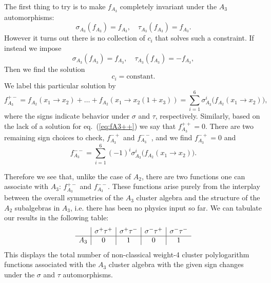 \documentclass[11pt]{article}
\begin{document}
The first thing to try is to make $f_{A_3}$ completely invariant under the $A_3$ automorphisms:
\begin{equation}\label{eq:fA3++}
	\sigma_{A_3}(f_{A_3}) = f_{A_3},\quad \tau_{A_3}(f_{A_3}) = f_{A_3}.  
\end{equation}
However it turns out there is no collection of $c_i$ that solves such a constraint. If instead we impose 
\begin{equation}
	\sigma_{A_3}(f_{A_3}) = f_{A_3},\quad \tau_{A_3}(f_{A_3}) = -f_{A_3},
\end{equation}
Then we find the solution 
\begin{equation}
	c_i = \text{constant}.
\end{equation}
We label this particular solution by 
\begin{equation}
	f_{A_3}^{+-} = f_{A_2}(x_1 \to x_2) + \ldots + f_{A_2}(x_1\to x_2 \left(1+x_3\right)) = \sum_{i=1}^6 \sigma_{A_3}^i\big(f_{A_2}(x_1\to x_2)\big),
\end{equation}
where the signs indicate behavior under $\sigma$ and $\tau$, respectively. Similarly, based on the lack of a solution for eq.~(\ref{eq:fA3++}) we say that $f_{A_3}^{++} = 0$. There are two remaining sign choices to check, $f_{A_3}^{-+}$ and $f_{A_3}^{--}$, and we find $f_{A_3}^{-+} = 0$ and		
\begin{equation}
	f_{A_3}^{--} =\sum_{i=1}^6(-1)^i\sigma_{A_3}^i \big(f_{A_2}(x_1\to x_2)\big).
\end{equation}

Therefore we see that, unlike the case of $A_2$, there are two functions one can associate with $A_3$: $f_{A_3}^{+-}$ and $f_{A_3}^{--}$. These functions arise purely from the interplay between the overall symmetries of the $A_3$ cluster algebra and the structure of the $A_2$ subalgebras in $A_3$, i.e. there has been no physics input so far. We can tabulate our results in the following table:
\begin{equation}\label{eq:a3-func-counts}
\begin{array}{ l | c | c | c | c }			
  & \sigma^+\tau^+ & \sigma^+\tau^- & \sigma^-\tau^+ & \sigma^-\tau^- \\
  \hline
  A_3 & 0 & 1 & 0 & 1 \\  
\end{array} 
\end{equation}
This displays the total number of non-classical weight-4 cluster polylogarithm functions associated with the $A_3$ cluster algebra with the given sign changes under the $\sigma$ and $\tau$ automorphisms. 
\end{document}
